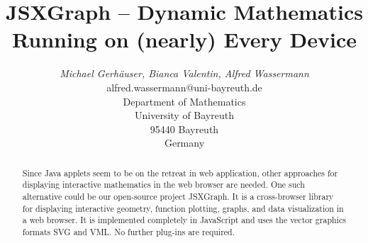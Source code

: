 \documentclass[12pt,a4paper]{article}%
\begin{document}
%
%
\title{JSXGraph -- Dynamic Mathematics Running on (nearly) Every Device}%
%
%
\author{\begin{tabular}{c}
\textit{Michael Gerh\"auser, Bianca Valentin, Alfred Wassermann} \\
alfred.wassermann@uni-bayreuth.de\\
Department of Mathematics\\
University of Bayreuth\\
95440 Bayreuth\\
Germany\end{tabular}
}%
%
\date{}                                                   %
\maketitle                                                %
%
%
\begin{abstract}
%
Since Java applets seem to be on the retreat in web application, other 
approaches for displaying interactive mathematics in the web browser are needed. 
One such alternative could be our open-source project JSXGraph. It is a 
cross-browser library for displaying interactive geometry, function plotting, 
graphs, and data visualization in a web browser. It is implemented completely 
in JavaScript and uses the vector graphics formats SVG and VML. No further 
plug-ins are required.
%
\end{abstract}%
%
\thispagestyle{fancy}                                     %
%
%
\end{document}

